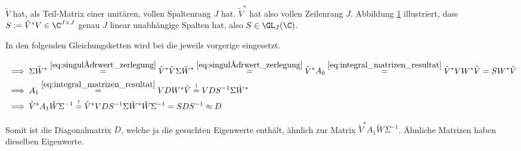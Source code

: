 $\tilde V$ hat, als Teil-Matrix einer unitären, vollen Spaltenrang $J$ hat.
$\tilde V^\ast$ hat also vollen Zeilenrang $J$.
Abbildung \ref{fig:rang_2} illustriert, dass $S := \tilde V^\ast V \in \C^{J \times J}$ genau $J$ linear unabhängige Spalten hat, also $S \in \GL_J(\C)$.

\begin{figure}[!ht]
    \centering
    \caption{}
    \label{fig:rang_2}
\end{figure}

In den folgenden Gleichungsketten wird bei \Quote{!} die jeweils vorgerige eingesetzt.

\begin{align*}
    & \implies
    \Sigma \tilde W^\ast
    \stackrel
    {
        \eqref{eq:singulärwert_zerlegung}
    }{=}
    \tilde V^\ast \tilde V \Sigma \tilde W^\ast
    \stackrel
    {
        \eqref{eq:singulärwert_zerlegung}
    }{=}
    \tilde V^\ast A_0
    \stackrel
    {
        \eqref{eq:integral_matrizen_resultat}
    }{=}
    \tilde V^\ast V W^\ast \hat V
    =
    S W^\ast \hat V \\
    & \implies
    A_1
    \stackrel
    {
        \eqref{eq:integral_matrizen_resultat}
    }{=}
    V D W^\ast \hat V
    \stackrel{!}{=}
    V D S^{-1} \Sigma \tilde W^\ast \\
    & \implies
    \tilde V^\ast A_1 \tilde W \Sigma^{-1}
    \stackrel{!}{=}
    \tilde V^\ast V D S^{-1} \Sigma \tilde W^\ast \tilde W \Sigma^{-1}
    =
    S D S^{-1}
    \approx
    D
\end{align*}

Somit ist die Diagonalmatrix $D$, welche ja die gesuchten Eigenwerte enthält, ähnlich zur Matrix $\tilde V^\ast A_1 \tilde W \Sigma^{-1}$.
Ähnliche Matrizen haben dieselben Eigenwerte.
